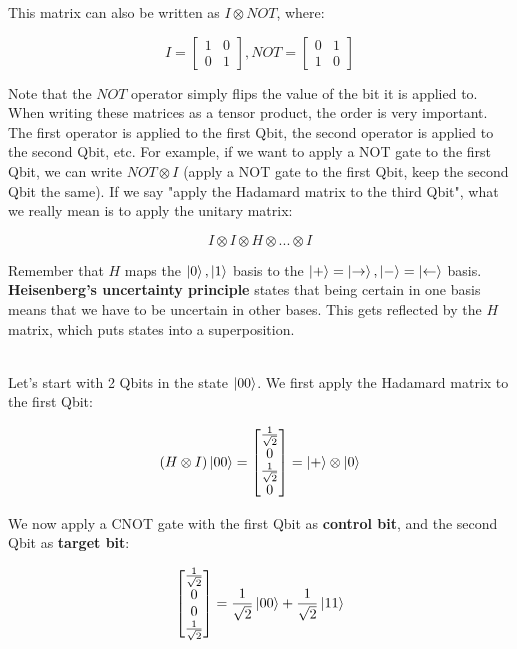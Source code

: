\documentclass[12pt]{article}
\begin{document}
\noindent
This matrix can also be written as $I \otimes NOT$, where:

\[ I = \begin{bmatrix}
    1 & 0 \\
    0 & 1
\end{bmatrix}, NOT = \begin{bmatrix}
    0 & 1 \\
    1 & 0
\end{bmatrix} \]

\noindent
Note that the $NOT$ operator simply flips the value of the bit it is applied to.
When writing these matrices as a tensor product, the order is very important.
The first operator is applied to the first Qbit, the second operator is applied to the second Qbit, etc.
For example, if we want to apply a NOT gate to the first Qbit, we can write $NOT \otimes I$ (apply a NOT gate to the first Qbit, keep the second Qbit the same).
If we say "apply the Hadamard matrix to the third Qbit", what we really mean is to apply the unitary matrix:

\[ I \otimes I \otimes H \otimes ... \otimes I \]

\newpage
\noindent
Remember that $H$ maps the $\ket{0}, \ket{1}$ basis to the $\ket{+} = \ket{\rightarrow}, \ket{-} = \ket{\leftarrow}$ basis.
\textbf{Heisenberg's uncertainty principle} states that being certain in one basis means that we have to be uncertain in other bases.
This gets reflected by the $H$ matrix, which puts states into a superposition.

\noindent
\\
Let's start with 2 Qbits in the state $\ket{00}$.
We first apply the Hadamard matrix to the first Qbit:

\[ \left( H \otimes I \right) \ket{00} = \begin{bmatrix}
    \frac{1}{\sqrt{2}} \\ 0 \\ \frac{1}{\sqrt{2}} \\ 0
\end{bmatrix} = \ket{+} \otimes \ket{0} \]

\noindent
We now apply a CNOT gate with the first Qbit as \textbf{control bit}, and the second Qbit as \textbf{target bit}:

\[ \begin{bmatrix}
    \frac{1}{\sqrt{2}} \\ 0 \\ 0 \\ \frac{1}{\sqrt{2}}
\end{bmatrix} = \frac{1}{\sqrt{2}}\ket{00} + \frac{1}{\sqrt{2}}\ket{11} \]
\end{document}
